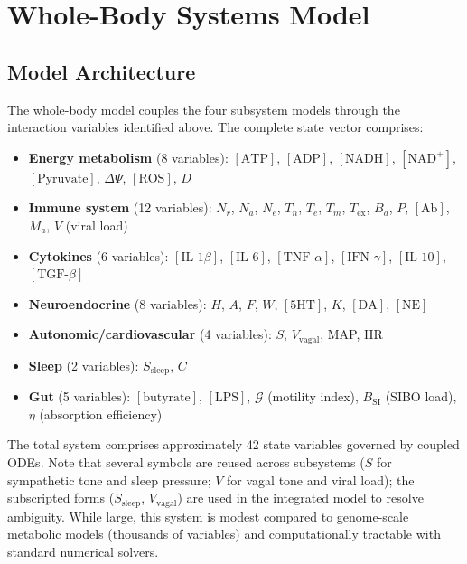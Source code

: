 \section{Whole-Body Systems Model}
\label{sec:whole-body-model}

\subsection{Model Architecture}
\label{sec:model-architecture}

The whole-body model couples the four subsystem models through the interaction variables identified above. The complete state vector comprises:

\begin{itemize}
    \item \textbf{Energy metabolism} (8 variables): $[\text{ATP}]$, $[\text{ADP}]$, $[\text{NADH}]$, $[\text{NAD}^+]$, $[\text{Pyruvate}]$, $\Delta\Psi$, $[\text{ROS}]$, $D$
    \item \textbf{Immune system} (12 variables): $N_r$, $N_a$, $N_e$, $T_n$, $T_e$, $T_m$, $T_{\text{ex}}$, $B_a$, $P$, $[\text{Ab}]$, $M_a$, $V$ (viral load)
    \item \textbf{Cytokines} (6 variables): $[\text{IL-1}\beta]$, $[\text{IL-6}]$, $[\text{TNF-}\alpha]$, $[\text{IFN-}\gamma]$, $[\text{IL-10}]$, $[\text{TGF-}\beta]$
    \item \textbf{Neuroendocrine} (8 variables): $H$, $A$, $F$, $W$, $[5\text{HT}]$, $K$, $[\text{DA}]$, $[\text{NE}]$
    \item \textbf{Autonomic/cardiovascular} (4 variables): $S$, $V_{\text{vagal}}$, MAP, HR
    \item \textbf{Sleep} (2 variables): $S_{\text{sleep}}$, $C$
    \item \textbf{Gut} (5 variables): $[\text{butyrate}]$, $[\text{LPS}]$, $\mathcal{G}$ (motility index), $B_{\text{SI}}$ (SIBO load), $\eta$ (absorption efficiency)
\end{itemize}

The total system comprises approximately 42 state variables governed by coupled ODEs. Note that several symbols are reused across subsystems ($S$ for sympathetic tone and sleep pressure; $V$ for vagal tone and viral load); the subscripted forms ($S_{\text{sleep}}$, $V_{\text{vagal}}$) are used in the integrated model to resolve ambiguity. While large, this system is modest compared to genome-scale metabolic models (thousands of variables) and computationally tractable with standard numerical solvers.

